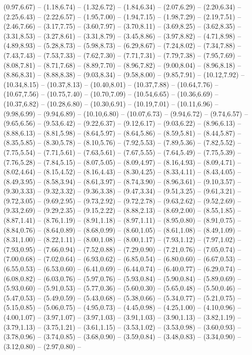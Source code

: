 \providecommand\Hoehe[1]{\csname geo:Hoehe:#1\endcsname}
\def\HoeheListe{100,200,300,500,750,1000,1500}
\expandafter\def\csname geo:Hoehe:100\endcsname{
  (0.97,6.67) -- (1.18,6.74) -- (1.32,6.72) -- (1.84,6.34) -- (2.07,6.29) -- (2.20,6.34) -- (2.25,6.43) -- (2.22,6.57) -- (1.95,7.00) -- (1.94,7.15) -- (1.98,7.29) -- (2.19,7.51) -- (2.46,7.66) -- (3.17,7.75) -- (3.60,7.97) -- (3.70,8.11) -- (3.69,8.25) -- (3.62,8.35) -- (3.31,8.53) -- (3.27,8.61) -- (3.31,8.79) -- (3.45,8.86) -- (3.97,8.82) -- (4.71,8.98) -- (4.89,8.93) -- (5.28,8.73) -- (5.98,8.73) -- (6.29,8.67) -- (7.24,8.02) -- (7.34,7.88) -- (7.43,7.43) -- (7.53,7.33) -- (7.62,7.30) -- (7.71,7.31) -- (7.79,7.38) -- (7.95,7.69) -- (8.08,7.81) -- (8.71,7.68) -- (8.89,7.70) -- (8.96,7.82) -- (9.00,8.04) -- (8.96,8.18) -- (8.86,8.31) -- (8.88,8.38) -- (9.03,8.34) -- (9.58,8.00) -- (9.85,7.91) -- (10.12,7.92) -- (10.34,8.15) -- (10.37,8.13) -- (10.40,8.01) -- (10.37,7.88) -- (10.64,7.76) -- (10.67,7.56) -- (10.75,7.40) -- (10.70,7.09) -- (10.54,6.65) -- (10.36,6.69) -- (10.37,6.82) -- (10.28,6.80) -- (10.30,6.91) -- (10.19,7.01) -- (10.11,6.96) -- (9.98,6.99) -- (9.94,6.89) -- (10.10,6.80) -- (10.07,6.73) -- (9.94,6.72) -- (9.74,6.57) -- (9.65,6.56) -- (9.53,6.42) -- (9.22,6.37) -- (9.12,6.17) -- (9.03,6.22) -- (8.96,6.13) -- (8.88,6.13) -- (8.81,5.98) -- (8.64,5.97) -- (8.64,5.86) -- (8.59,5.81) -- (8.44,5.87) -- (8.35,5.85) -- (8.30,5.78) -- (8.10,5.76) -- (7.92,5.53) -- (7.89,5.36) -- (7.82,5.52) -- (7.75,5.54) -- (7.71,5.61) -- (7.63,5.61) -- (7.67,5.55) -- (7.64,5.49) -- (7.75,5.39) -- (7.76,5.28) -- (7.84,5.15) -- (8.07,5.05) -- (8.09,4.97) -- (8.16,4.93) -- (8.09,4.71) -- (8.02,4.64) -- (8.15,4.52) -- (8.16,4.43) -- (8.30,4.25) -- (8.33,4.11) -- (8.43,4.05) -- (8.49,3.95) -- (8.58,3.94) -- (8.61,3.97) -- (8.74,3.90) -- (8.96,3.61) -- (9.10,3.57) -- (9.30,3.33) -- (9.32,3.32) -- (9.36,3.38) -- (9.47,3.34) -- (9.51,3.25) -- (9.61,3.21) -- (9.72,3.05) -- (9.69,2.95) -- (9.73,2.92) -- (9.72,2.78) -- (9.63,2.62) -- (9.52,2.69) -- (9.33,2.69) -- (9.29,2.35) -- (9.15,2.22) -- (8.88,2.13) -- (8.69,2.00) -- (8.55,1.85) -- (8.87,1.41) -- (8.76,1.19) -- (8.91,1.18) -- (8.97,1.11) -- (8.95,0.80) -- (8.91,0.75) -- (8.84,0.76) -- (8.64,0.89) -- (8.68,0.99) -- (8.60,1.05) -- (8.61,1.08) -- (8.49,1.09) -- (8.31,1.00) -- (8.22,1.11) -- (8.00,1.08) -- (8.00,1.17) -- (7.93,1.12) -- (7.97,1.02) -- (7.93,0.95) -- (7.66,0.94) -- (7.52,0.88) -- (7.29,0.90) -- (7.21,0.76) -- (7.05,0.74) -- (7.00,0.68) -- (7.02,0.64) -- (6.93,0.62) -- (6.85,0.54) -- (6.80,0.60) -- (6.67,0.53) -- (6.55,0.53) -- (6.53,0.60) -- (6.41,0.69) -- (6.44,0.74) -- (6.40,0.77) -- (6.29,0.74) -- (6.08,0.82) -- (6.03,0.76) -- (5.97,0.76) -- (5.93,0.84) -- (5.90,0.84) -- (5.89,0.69) -- (5.93,0.60) -- (5.91,0.53) -- (5.77,0.36) -- (5.60,0.30) -- (5.65,0.48) -- (5.50,0.46) -- (5.47,0.53) -- (5.49,0.59) -- (5.43,0.68) -- (5.38,0.66) -- (5.34,0.77) -- (5.21,0.75) -- (5.15,0.85) -- (5.06,0.75) -- (4.95,0.73) -- (4.45,0.98) -- (4.25,1.00) -- (4.10,0.96) -- (4.00,1.07) -- (3.97,1.07) -- (3.97,1.03) -- (3.91,1.03) -- (3.90,1.13) -- (3.82,1.19) -- (3.79,1.13) -- (3.75,1.21) -- (3.61,1.15) -- (3.53,1.02) -- (3.53,0.98) -- (3.60,0.93) -- (3.78,0.96) -- (3.74,0.85) -- (3.68,0.90) -- (3.59,0.84) -- (3.48,0.83) -- (3.34,0.90) -- (3.12,0.80) -- (2.97,0.80) -- }
